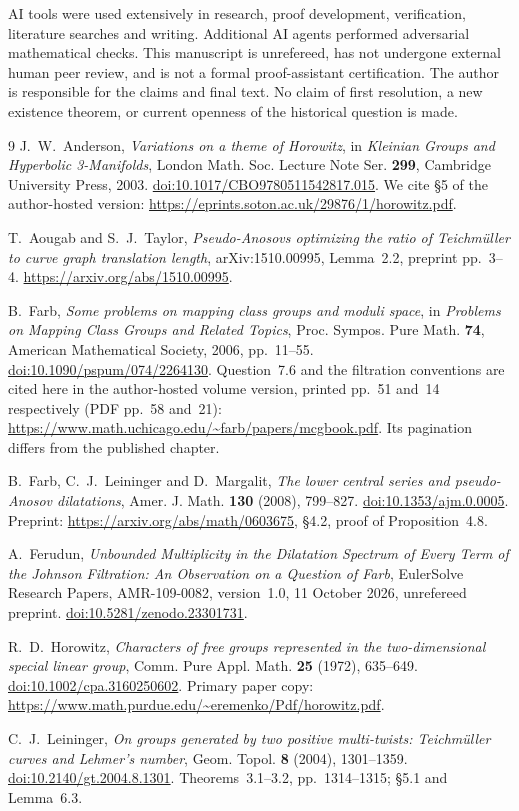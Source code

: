 \documentclass[11pt]{article}
\theoremstyle{remark}\newtheorem*{remark}{Remark}
\begin{document}
AI tools were used extensively in research, proof development,
verification, literature searches and writing. Additional AI agents
performed adversarial mathematical checks. This manuscript is
unrefereed, has not undergone external human peer review, and is not
a formal proof-assistant certification. The author is responsible for
the claims and final text. No claim of first resolution, a new existence
theorem, or current openness of the historical question is made.

\begin{thebibliography}{9}
 J.~W.~Anderson,
\emph{Variations on a theme of Horowitz},
in \emph{Kleinian Groups and Hyperbolic 3-Manifolds},
London Math. Soc. Lecture Note Ser. \textbf{299},
Cambridge University Press, 2003.
\href{https://doi.org/10.1017/CBO9780511542817.015}{doi:10.1017/CBO9780511542817.015}.
We cite \S5 of the author-hosted version:
\url{https://eprints.soton.ac.uk/29876/1/horowitz.pdf}.

 T.~Aougab and S.~J.~Taylor,
\emph{Pseudo-Anosovs optimizing the ratio of Teichm\"uller to curve graph
translation length}, arXiv:1510.00995, Lemma~2.2, preprint pp.~3--4.
\url{https://arxiv.org/abs/1510.00995}.

 B.~Farb,
\emph{Some problems on mapping class groups and moduli space},
in \emph{Problems on Mapping Class Groups and Related Topics},
Proc. Sympos. Pure Math. \textbf{74}, American Mathematical Society,
2006, pp.~11--55.
\href{https://doi.org/10.1090/pspum/074/2264130}{doi:10.1090/pspum/074/2264130}.
Question~7.6 and the filtration conventions are cited here in the
author-hosted volume version, printed pp.~51 and~14 respectively
(PDF pp.~58 and~21):
\url{https://www.math.uchicago.edu/~farb/papers/mcgbook.pdf}.
Its pagination differs from the published chapter.

 B.~Farb, C.~J.~Leininger and D.~Margalit,
\emph{The lower central series and pseudo-Anosov dilatations},
Amer. J. Math. \textbf{130} (2008), 799--827.
\href{https://doi.org/10.1353/ajm.0.0005}{doi:10.1353/ajm.0.0005}.
Preprint: \url{https://arxiv.org/abs/math/0603675},
\S4.2, proof of Proposition~4.8.

 A.~Ferudun,
\emph{Unbounded Multiplicity in the Dilatation Spectrum of Every Term
of the Johnson Filtration: An Observation on a Question of Farb},
EulerSolve Research Papers, AMR-109-0082, version~1.0,
11 October 2026, unrefereed preprint.
\href{https://doi.org/10.5281/zenodo.23301731}{doi:10.5281/zenodo.23301731}.

 R.~D.~Horowitz,
\emph{Characters of free groups represented in the two-dimensional
special linear group}, Comm. Pure Appl. Math. \textbf{25} (1972),
635--649.
\href{https://doi.org/10.1002/cpa.3160250602}{doi:10.1002/cpa.3160250602}.
Primary paper copy:
\url{https://www.math.purdue.edu/~eremenko/Pdf/horowitz.pdf}.

 C.~J.~Leininger,
\emph{On groups generated by two positive multi-twists:
Teichm\"uller curves and Lehmer's number},
Geom. Topol. \textbf{8} (2004), 1301--1359.
\href{https://doi.org/10.2140/gt.2004.8.1301}{doi:10.2140/gt.2004.8.1301}.
Theorems~3.1--3.2, pp.~1314--1315; \S5.1 and Lemma~6.3.
\end{thebibliography}
\end{document}
